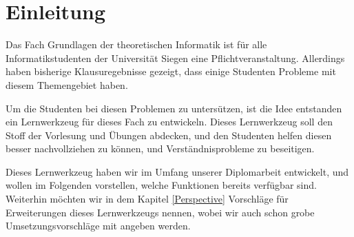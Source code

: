

\chapter{Einleitung}\label{Introduction}

Das Fach Grundlagen der theoretischen Informatik ist für alle
Informatikstudenten der Universität Siegen eine Pflichtveranstaltung. Allerdings
haben bisherige Klausuregebnisse gezeigt, dass einige Studenten Probleme mit diesem
Themengebiet haben.\vspace{10pt}

Um die Studenten bei diesen Problemen zu untersützen, ist die Idee entstanden
ein Lernwerkzeug für dieses Fach zu entwickeln. Dieses Lernwerkzeug soll den
Stoff der Vorlesung und Übungen abdecken, und den Studenten helfen diesen
besser nachvollziehen zu können, und Verständnisprobleme zu
beseitigen.\vspace{10pt}

Dieses Lernwerkzeug haben wir im Umfang unserer Diplomarbeit entwickelt, und
wollen im Folgenden vorstellen, welche Funktionen bereits verfügbar sind.
Weiterhin möchten wir in dem Kapitel \ref{Perspective} Vorschläge für Erweiterungen
dieses Lernwerkzeugs nennen, wobei wir auch schon grobe Umsetzungsvorschläge
mit angeben werden.\vspace{10pt}
